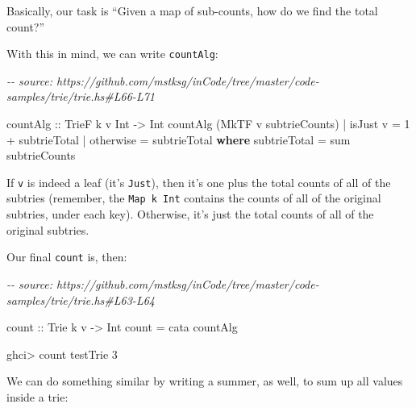 \documentclass[]{article}
\newenvironment{Shaded}{}{}
\newcommand{\CommentTok}[1]{\textcolor[rgb]{0.38,0.63,0.69}{\textit{#1}}}
\newcommand{\DataTypeTok}[1]{\textcolor[rgb]{0.56,0.13,0.00}{#1}}
\newcommand{\DecValTok}[1]{\textcolor[rgb]{0.25,0.63,0.44}{#1}}
\newcommand{\FunctionTok}[1]{\textcolor[rgb]{0.02,0.16,0.49}{#1}}
\newcommand{\KeywordTok}[1]{\textcolor[rgb]{0.00,0.44,0.13}{\textbf{#1}}}
\newcommand{\NormalTok}[1]{#1}
\newcommand{\OperatorTok}[1]{\textcolor[rgb]{0.40,0.40,0.40}{#1}}
\newcommand{\OtherTok}[1]{\textcolor[rgb]{0.00,0.44,0.13}{#1}}
\begin{document}
Basically, our task is ``Given a map of sub-counts, how do we find the total
count?''

With this in mind, we can write \texttt{countAlg}:

\begin{Shaded}
\begin{Highlighting}[]
\CommentTok{{-}{-} source: https://github.com/mstksg/inCode/tree/master/code{-}samples/trie/trie.hs\#L66{-}L71}

\OtherTok{countAlg ::} \DataTypeTok{TrieF}\NormalTok{ k v }\DataTypeTok{Int} \OtherTok{{-}\textgreater{}} \DataTypeTok{Int}
\NormalTok{countAlg (}\DataTypeTok{MkTF}\NormalTok{ v subtrieCounts)}
    \OperatorTok{|}\NormalTok{ isJust v  }\OtherTok{=} \DecValTok{1} \OperatorTok{+}\NormalTok{ subtrieTotal}
    \OperatorTok{|} \FunctionTok{otherwise} \OtherTok{=}\NormalTok{ subtrieTotal}
  \KeywordTok{where}
\NormalTok{    subtrieTotal }\OtherTok{=} \FunctionTok{sum}\NormalTok{ subtrieCounts}
\end{Highlighting}
\end{Shaded}

If \texttt{v} is indeed a leaf (it's \texttt{Just}), then it's one plus the
total counts of all of the subtries (remember, the \texttt{Map\ k\ Int} contains
the counts of all of the original subtries, under each key). Otherwise, it's
just the total counts of all of the original subtries.

Our final \texttt{count} is, then:

\begin{Shaded}
\begin{Highlighting}[]
\CommentTok{{-}{-} source: https://github.com/mstksg/inCode/tree/master/code{-}samples/trie/trie.hs\#L63{-}L64}

\OtherTok{count ::} \DataTypeTok{Trie}\NormalTok{ k v }\OtherTok{{-}\textgreater{}} \DataTypeTok{Int}
\NormalTok{count }\OtherTok{=}\NormalTok{ cata countAlg}
\end{Highlighting}
\end{Shaded}

\begin{Shaded}
\begin{Highlighting}[]
\NormalTok{ghci}\OperatorTok{\textgreater{}}\NormalTok{ count testTrie}
\DecValTok{3}
\end{Highlighting}
\end{Shaded}

We can do something similar by writing a summer, as well, to sum up all values
inside a trie:
\end{document}
